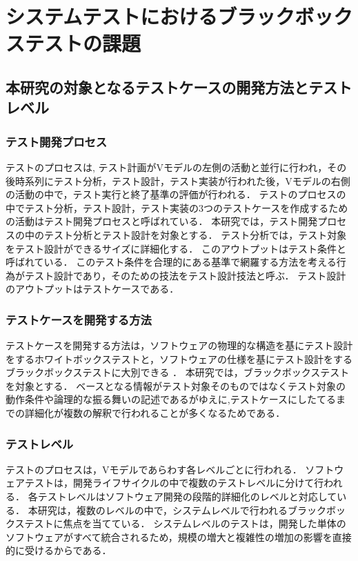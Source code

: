 \documentclass[10pt,a4j]{jarticle}
\begin{document}
\section{システムテストにおけるブラックボックステストの課題} \label{chap:2}
\subsection{本研究の対象となるテストケースの開発方法とテストレベル} \label{sec:2-1}
\subsubsection{テスト開発プロセス}
テストのプロセスは, テスト計画がVモデルの左側の活動と並行に行われ，その後時系列にテスト分析，テスト設計，テスト実装が行われた後，Vモデルの右側の活動の中で，テスト実行と終了基準の評価が行われる．
テストのプロセスの中でテスト分析，テスト設計，テスト実装の3つのテストケースを作成するための活動はテスト開発プロセスと呼ばれている\cite{ISTQB}．
本研究では，テスト開発プロセスの中のテスト分析とテスト設計を対象とする．
テスト分析では，テスト対象をテスト設計ができるサイズに詳細化する．
このアウトプットはテスト条件と呼ばれている．
このテスト条件を合理的にある基準で網羅する方法を考える行為がテスト設計であり，そのための技法をテスト設計技法と呼ぶ．
テスト設計のアウトプットはテストケースである．

\subsubsection{テストケースを開発する方法}
テストケースを開発する方法は，ソフトウェアの物理的な構造を基にテスト設計をするホワイトボックステストと，ソフトウェアの仕様を基にテスト設計をするブラックボックステストに大別できる\cite{myers2011art} ．
本研究では，ブラックボックステストを対象とする．
ベースとなる情報がテスト対象そのものではなくテスト対象の動作条件や論理的な振る舞いの記述であるがゆえに,テストケースにしたてるまでの詳細化が複数の解釈で行われることが多くなるためである．

\subsubsection{テストレベル}
テストのプロセスは，Vモデルであらわす各レベルごとに行われる．
ソフトウェアテストは，開発ライフサイクルの中で複数のテストレベルに分けて行われる．
各テストレベルはソフトウェア開発の段階的詳細化のレベルと対応している．
本研究は，複数のレベルの中で，システムレベルで行われるブラックボックステストに焦点を当てている．
システムレベルのテストは，開発した単体のソフトウェアがすべて統合されるため，規模の増大と複雑性の増加の影響を直接的に受けるからである．
\end{document}
